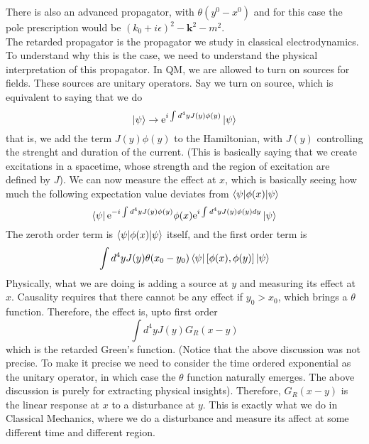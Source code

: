 \documentclass[11pt, notitlepage]{report}
\newcommand{\e}{\mathrm{e}}
\numberwithin{equation}{section}
\begin{document}
    There is also an advanced propagator, with \(\theta(y^0-x^0)\) and for this case the pole prescription would be \((k_0 + i\epsilon)^2 - \textbf{k}^2 - m^2\).\\

    The retarded propagator is the propagator we study in classical electrodynamics. To understand why this is the case, we need to understand the physical interpretation of this propagator. In QM, we are allowed to turn on sources for fields. These sources are unitary operators. Say we turn on source, which is equivalent to saying that we do 
    \begin{equation*}
        \ket{\psi} \to \e^{i\int d^4y J(y) \phi(y)} \ket{\psi}
    \end{equation*}
    that is, we add the term \(J(y) \phi(y)\) to the Hamiltonian, with \(J(y)\) controlling the strenght and duration of the current. (This is basically saying that we create excitations in a spacetime, whose strength and the region of excitation are defined by \(J\)). We can now measure the effect at \(x\), which is basically seeing how much the following expectation value deviates from  \(\braket{\psi | \phi(x) | \psi}\)
    \begin{equation*}
        \bra{\psi} \e^{-i\int d^4y J(y) \phi(y) } \phi(x) \e^{i\int d^4y J(y) \phi(y) dy} \ket{\psi}
    \end{equation*}
    The zeroth order term is \(\braket{\psi | \phi(x) | \psi}\) itself, and the first order term is 
    \begin{equation*}
        \int d^4y J(y) \theta(x_0 - y_0)\bra{\psi}[\phi(x), \phi(y)]\ket{\psi}
    \end{equation*}
    Physically, what we are doing is adding a source at \(y\) and measuring its effect at \(x\). Causality requires that there cannot be any effect if \(y_0 > x_0\), which brings a \(\theta\) function. Therefore, the effect is, upto first order 
    \begin{equation*}
        \int d^4y J(y) G_R(x-y) 
    \end{equation*}
    which is the retarded Green's function. (Notice that the above discussion was not precise. To make it precise we need to consider the time ordered exponential as the unitary operator, in which case the \(\theta\) function naturally emerges. The above discussion is purely for extracting physical insights). Therefore, \(G_R(x-y)\) is the linear response at \(x\) to a disturbance at \(y\). This is exactly what we do in Classical Mechanics, where we do a disturbance and measure its affect at some different time and different region.
\end{document}
